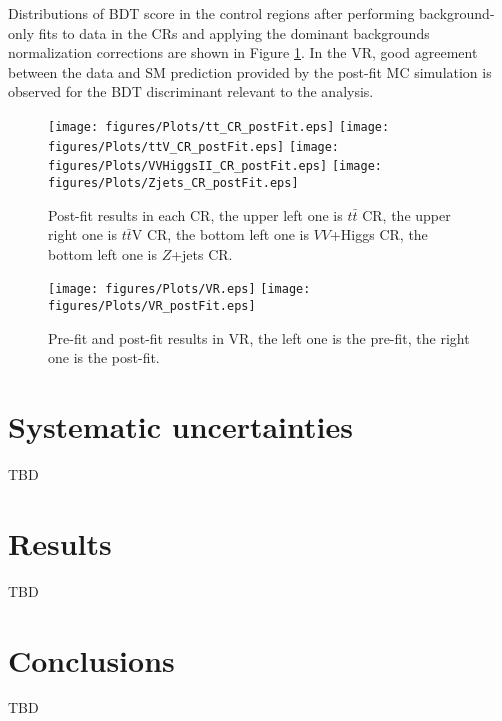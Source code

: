 Distributions of BDT score in the control regions after performing background-only fits to data in the CRs and applying the dominant backgrounds normalization corrections are shown in Figure \ref{Fig.CRs post-fit}. In the VR, good agreement between the data and SM prediction provided by the post-fit MC simulation is observed for the BDT discriminant relevant to the analysis.

\begin{figure}[H]
	\caption{Post-fit results in each CR, the upper left one is $t\bar{t}$ CR, the upper right one is $t\bar{t}$V CR, the bottom left one is $VV$+Higgs CR, the bottom left one is $Z$+jets CR.}
	\label{Fig.CRs post-fit}
	\centering
	\texttt{[image: figures/Plots/tt\_CR\_postFit.eps]}
	\texttt{[image: figures/Plots/ttV\_CR\_postFit.eps]}
	\texttt{[image: figures/Plots/VVHiggsII\_CR\_postFit.eps]}
	\texttt{[image: figures/Plots/Zjets\_CR\_postFit.eps]}
\end{figure}

\begin{figure}[H]
	\caption{Pre-fit and post-fit results in VR, the left one is the pre-fit, the right one is the post-fit.}
	\label{Fig.VR}
	\centering
	\texttt{[image: figures/Plots/VR.eps]}
	\texttt{[image: figures/Plots/VR\_postFit.eps]}
\end{figure}

\section{Systematic uncertainties}
\label{sec:error}

TBD

\section{Results}
\label{sec:results}

TBD

\section{Conclusions}
\label{sec:conclusion}

TBD

